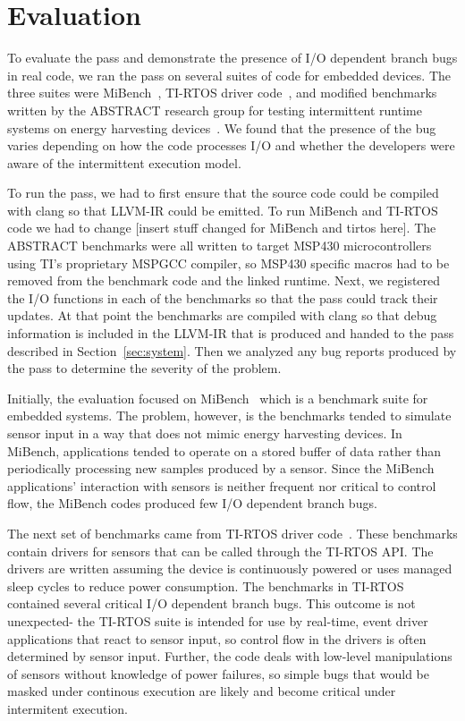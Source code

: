 \section{Evaluation}
%
%
To evaluate the pass and demonstrate the presence of I/O dependent branch
bugs in real code, we ran the pass on several suites of code for embedded
devices. The three suites were MiBench~\cite{mibench}, TI-RTOS driver
code~\cite{tirtos}, and modified benchmarks written by the ABSTRACT research
group for testing intermittent runtime systems on energy harvesting
devices~\cite{alpaca,chain,dino,capybara}.  We found that the presence of the
bug varies depending on how the code processes I/O and whether the developers
were aware of the intermittent execution model.

To run the pass, we had to first ensure that the source code could be compiled
with clang so that LLVM-IR could be emitted. To run MiBench and TI-RTOS code we
had to change [insert stuff changed for MiBench and tirtos here]. The ABSTRACT
benchmarks were all written to target MSP430 microcontrollers using TI's
proprietary MSPGCC compiler, so MSP430 specific macros had to be removed from
the benchmark code and the linked runtime.
%
Next, we registered the I/O functions in each of the benchmarks so that the pass
could track their updates. At that point the benchmarks are compiled with
clang so that debug information is included in the LLVM-IR that is produced and
handed to the pass described in Section~\ref{sec:system}. Then we analyzed any
bug reports produced by the pass to determine the severity of the problem.

Initially, the evaluation focused on MiBench~\cite{mibench} which is a benchmark
suite for embedded systems. The problem, however, is the benchmarks tended to
simulate sensor input in a way that does not mimic energy harvesting devices. In
MiBench, applications tended to operate on a stored buffer of data rather than
periodically processing new samples produced by a sensor. Since the MiBench
applications' interaction with sensors is neither frequent nor critical to
control flow, the MiBench codes produced few I/O dependent branch bugs.

The next set of benchmarks came from TI-RTOS driver code~\cite{tirtos}. These
benchmarks contain drivers for sensors that can be called through the TI-RTOS
API. The drivers are written assuming the device is continuously powered or uses
managed sleep cycles to reduce power consumption.
The benchmarks in TI-RTOS contained several critical I/O dependent branch bugs.
This outcome is not unexpected- the TI-RTOS suite is intended for use by
real-time, event driver applications that react to sensor input, so control flow
in the drivers is often determined by sensor input. Further, the code deals with
low-level manipulations of sensors without knowledge of power failures, so
simple bugs that would be masked under continous execution are likely and become
critical under intermitent execution.

